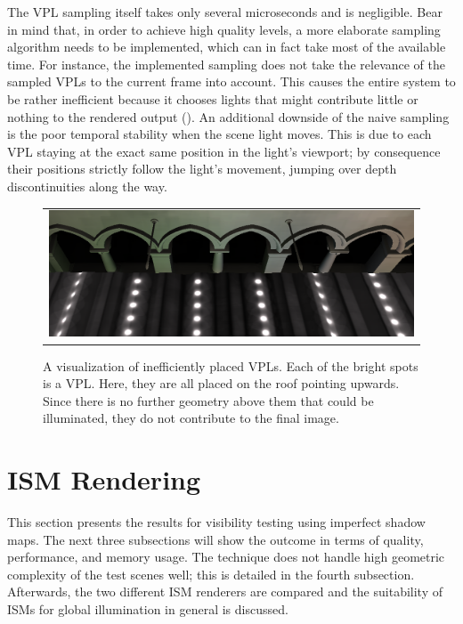 The VPL sampling itself takes only several microseconds and is negligible. Bear in mind that, in order to achieve high quality levels, a more elaborate sampling algorithm needs to be implemented, which can in fact take most of the available time. For instance, the implemented sampling does not take the relevance of the sampled VPLs to the current frame into account. This causes the entire system to be rather inefficient because it chooses lights that might contribute little or nothing to the rendered output (). An additional downside of the naive sampling is the poor temporal stability when the scene light moves. This is due to each VPL staying at the exact same position in the light's viewport; by consequence their positions strictly follow the light's movement, jumping over depth discontinuities along the way.

\begin{figure}[htb]
\centering
  \begin{tabular}{@{}c@{}}
    \includegraphics[width=1.0\textwidth]{screenshots/RSM_unfavorable} \\
  \end{tabular}
  \caption{A visualization of inefficiently placed VPLs. Each of the bright spots is a VPL. Here, they are all placed on the roof pointing upwards. Since there is no further geometry above them that could be illuminated, they do not contribute to the final image.}
  \label{fig:results:RSMUnfavorable}
\end{figure}




\section{ISM Rendering}
\label{sec:results:ism}

This section presents the results for visibility testing using imperfect shadow maps. The next three subsections will show the outcome in terms of quality, performance, and memory usage. The technique does not handle high geometric complexity of the test scenes well; this is detailed in the fourth subsection. Afterwards, the two different ISM renderers are compared and the suitability of ISMs for global illumination in general is discussed.


